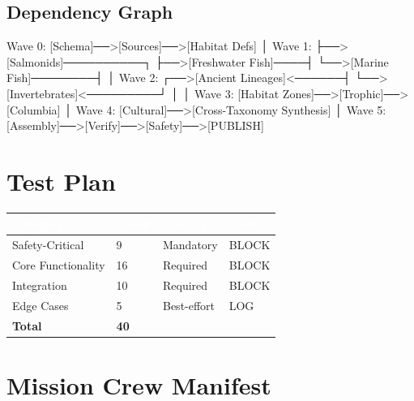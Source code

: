 \documentclass[11pt,letterpaper]{article}
\newcommand{\tableheader}[1]{\textbf{\sffamily\textcolor{white}{#1}}}
\begin{document}
\subsection{Dependency Graph}

\begin{asciibox}
Wave 0: [Schema]──>[Sources]──>[Habitat Defs]
             │
Wave 1:      ├──>[Salmonids]──────────┐
             ├──>[Freshwater Fish]────┤
             └──>[Marine Fish]────────┤
                                      │
Wave 2:  ┌──>[Ancient Lineages]<──────┤
         └──>[Invertebrates]<─────────┘
                  │          │
Wave 3:  [Habitat Zones]──>[Trophic]──>[Columbia]
                                │
Wave 4:  [Cultural]──>[Cross-Taxonomy Synthesis]
                              │
Wave 5:  [Assembly]──>[Verify]──>[Safety]──>[PUBLISH]
\end{asciibox}

\section{Test Plan}

\begin{center}
\begin{tabularx}{\textwidth}{L{3cm}C{1.5cm}C{1.5cm}C{1.5cm}}
\toprule
{}
\tableheader{Category} & \tableheader{Count} & \tableheader{Priority} & \tableheader{Failure} \\
\midrule
Safety-Critical & 9 & Mandatory & BLOCK \\
Core Functionality & 16 & Required & BLOCK \\
Integration & 10 & Required & BLOCK \\
Edge Cases & 5 & Best-effort & LOG \\
\midrule
\textbf{Total} & \textbf{40} & & \\
\bottomrule
\end{tabularx}
\end{center}

\section{Mission Crew Manifest}
\end{document}
